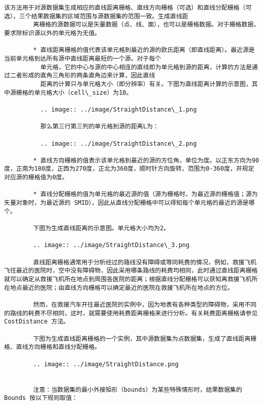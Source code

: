 \documentclass[11pt]{article}
\begin{document}
\begin{Verbatim}[commandchars=\\\{\}]
        该方法用于对源数据集生成相应的直线距离栅格、直线方向栅格（可选）和直线分配栅格（可选），三个结果数据集的区域范围与源数据集的范围一致。生成直线距
        离栅格的源数据可以是矢量数据（点、线、面），也可以是栅格数据。对于栅格数据，要求除标识源以外的单元格为无值。
        
        * 直线距离栅格的值代表该单元格到最近的源的欧氏距离（即直线距离）。最近源是当前单元格到达所有源中直线距离最短的一个源。对于每个
          单元格，它的中心与源的中心相连的直线即为单元格到源的距离，计算的方法是通过二者形成的直角三角形的两条直角边来计算，因此直线
          距离的计算只与单元格大小（即分辨率）有关。下图为直线距离计算的示意图，其中源栅格的单元格大小（cell\_size）为10。
        
          .. image:: ../image/StraightDistance\_1.png
        
          那么第三行第三列的单元格到源的距离L为：
        
          .. image:: ../image/StraightDistance\_2.png
        
        * 直线方向栅格的值表示该单元格到最近的源的方位角，单位为度。以正东方向为90度，正南为180度，正西为270度，正北为360度，顺时针方向旋转，范围为0-360度，并规定对应源的栅格值为0度。
        
        * 直线分配栅格的值为单元格的最近源的值（源为栅格时，为最近源的栅格值；源为矢量对象时，为最近源的 SMID），因此从直线分配栅格中可以得知每个单元格的最近的源是哪个。
        
        下图为生成直线距离的示意图。单元格大小均为2。
        
        .. image:: ../image/StraightDistance\_3.png
        
        直线距离栅格通常用于分析经过的路线没有障碍或等同耗费的情况，例如，救援飞机飞往最近的医院时，空中没有障碍物，因此采用哪条路线的耗费均相同，此时通过直线距离栅格就可以确定从救援飞机所在地点到周围各医院的距离；根据直线分配栅格可以获知离救援飞机所在地点最近的医院；由直线方向栅格可以确定最近的医院在救援飞机所在地点的方位。
        
        然而，在救援汽车开往最近医院的实例中，因为地表有各种类型的障碍物，采用不同的路线的耗费不尽相同，这时，就需要使用耗费距离栅格来进行分析。有关耗费距离栅格请参见 CostDistance 方法。
        
        下图为生成直线距离栅格的一个实例，其中源数据集为点数据集，生成了直线距离栅格、直线方向栅格和直线分配栅格。
        
        .. image:: ../image/StraightDistance.png
        
        
        注意：当数据集的最小外接矩形（bounds）为某些特殊情形时，结果数据集的 Bounds 按以下规则取值：
        

\end{Verbatim}
\end{document}
